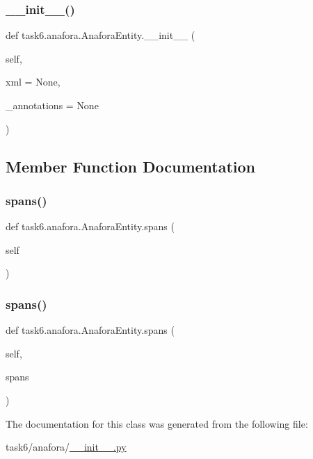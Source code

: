 \subsubsection{\texorpdfstring{\+\_\+\+\_\+init\+\_\+\+\_\+()}{\_\_init\_\_()}}
{\footnotesize\ttfamily def task6.\+anafora.\+Anafora\+Entity.\+\_\+\+\_\+init\+\_\+\+\_\+ (\begin{DoxyParamCaption}\item[{}]{self,  }\item[{}]{xml = {\ttfamily None},  }\item[{}]{\+\_\+annotations = {\ttfamily None} }\end{DoxyParamCaption})}



\subsection{Member Function Documentation}
\mbox{\label{classtask6_1_1anafora_1_1AnaforaEntity_ac21bd8b99a0cd7242c397f0133f4db19}} 
\subsubsection{\texorpdfstring{spans()}{spans()}\hspace{0.1cm}{\footnotesize\ttfamily [1/2]}}
{\footnotesize\ttfamily def task6.\+anafora.\+Anafora\+Entity.\+spans (\begin{DoxyParamCaption}\item[{}]{self }\end{DoxyParamCaption})}

\mbox{\label{classtask6_1_1anafora_1_1AnaforaEntity_a11c403442719b721ddf69182bcfb3e37}} 
\subsubsection{\texorpdfstring{spans()}{spans()}\hspace{0.1cm}{\footnotesize\ttfamily [2/2]}}
{\footnotesize\ttfamily def task6.\+anafora.\+Anafora\+Entity.\+spans (\begin{DoxyParamCaption}\item[{}]{self,  }\item[{}]{spans }\end{DoxyParamCaption})}



The documentation for this class was generated from the following file\+:\begin{DoxyCompactItemize}
\item 
task6/anafora/\hyperlink{task6_2anafora_2____init_____8py}{\+\_\+\+\_\+init\+\_\+\+\_\+.\+py}\end{DoxyCompactItemize}
